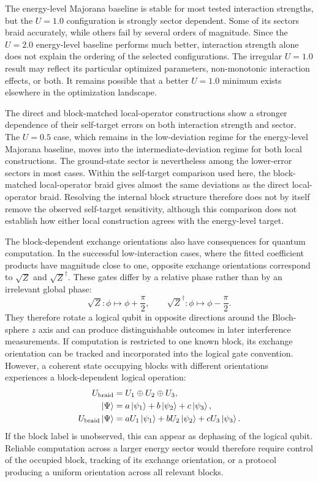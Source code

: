 The energy-level Majorana baseline is stable for most tested interaction strengths, but the $U=1.0$ configuration is strongly sector dependent. Some of its sectors braid accurately, while others fail by several orders of magnitude. Since the $U=2.0$ energy-level baseline performs much better, interaction strength alone does not explain the ordering of the selected configurations. The irregular $U=1.0$ result may reflect its particular optimized parameters, non-monotonic interaction effects, or both. It remains possible that a better $U=1.0$ minimum exists elsewhere in the optimization landscape.

The direct and block-matched local-operator constructions show a stronger dependence of their self-target errors on both interaction strength and sector. The $U=0.5$ case, which remains in the low-deviation regime for the energy-level Majorana baseline, moves into the intermediate-deviation regime for both local constructions. The ground-state sector is nevertheless among the lower-error sectors in most cases. Within the self-target comparison used here, the block-matched local-operator braid gives almost the same deviations as the direct local-operator braid. Resolving the internal block structure therefore does not by itself remove the observed self-target sensitivity, although this comparison does not establish how either local construction agrees with the energy-level target.

The block-dependent exchange orientations also have consequences for quantum computation. In the successful low-interaction cases, where the fitted coefficient products have magnitude close to one, opposite exchange orientations correspond to $\sqrt{Z}$ and $\sqrt{Z}^{\dagger}$. These gates differ by a relative phase rather than by an irrelevant global phase:
\begin{equation}
  \sqrt{Z}:
  \phi \mapsto \phi + \frac{\pi}{2},
  \qquad
  \sqrt{Z}^{\dagger}:
  \phi \mapsto \phi - \frac{\pi}{2}.
\end{equation}
They therefore rotate a logical qubit in opposite directions around the Bloch-sphere $z$ axis and can produce distinguishable outcomes in later interference measurements. If computation is restricted to one known block, its exchange orientation can be tracked and incorporated into the logical gate convention. However, a coherent state occupying blocks with different orientations experiences a block-dependent logical operation:
\begin{equation}
  \begin{aligned}
    U_{\mathrm{braid}} &= U_1 \oplus U_2 \oplus U_3, \\
    \ket{\Psi} &= a\ket{\psi_1} + b\ket{\psi_2} + c\ket{\psi_3}, \\
    U_{\mathrm{braid}}\ket{\Psi}
    &= aU_1\ket{\psi_1} + bU_2\ket{\psi_2} + cU_3\ket{\psi_3}.
  \end{aligned}
\end{equation}
If the block label is unobserved, this can appear as dephasing of the logical qubit. Reliable computation across a larger energy sector would therefore require control of the occupied block, tracking of its exchange orientation, or a protocol producing a uniform orientation across all relevant blocks.

